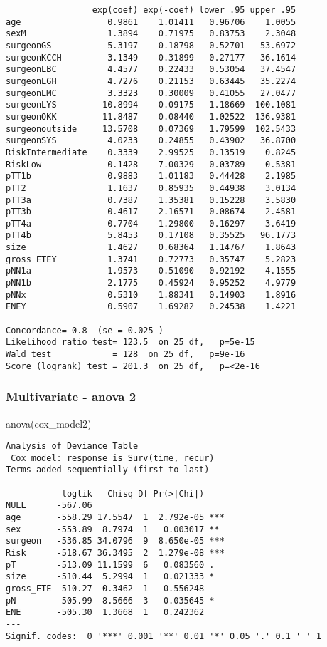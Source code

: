 \documentclass[
  letterpaper,
  DIV=11,
  numbers=noendperiod]{scrartcl}
\newenvironment{Shaded}{\begin{snugshade}}{\end{snugshade}}
\newcommand{\FunctionTok}[1]{\textcolor[rgb]{0.28,0.35,0.67}{#1}}
\newcommand{\NormalTok}[1]{\textcolor[rgb]{0.00,0.23,0.31}{#1}}
\begin{document}
\begin{verbatim}
                 exp(coef) exp(-coef) lower .95 upper .95
age                 0.9861    1.01411   0.96706    1.0055
sexM                1.3894    0.71975   0.83753    2.3048
surgeonGS           5.3197    0.18798   0.52701   53.6972
surgeonKCCH         3.1349    0.31899   0.27177   36.1614
surgeonLBC          4.4577    0.22433   0.53054   37.4547
surgeonLGH          4.7276    0.21153   0.63445   35.2274
surgeonLMC          3.3323    0.30009   0.41055   27.0477
surgeonLYS         10.8994    0.09175   1.18669  100.1081
surgeonOKK         11.8487    0.08440   1.02522  136.9381
surgeonoutside     13.5708    0.07369   1.79599  102.5433
surgeonSYS          4.0233    0.24855   0.43902   36.8700
RiskIntermediate    0.3339    2.99525   0.13519    0.8245
RiskLow             0.1428    7.00329   0.03789    0.5381
pTT1b               0.9883    1.01183   0.44428    2.1985
pTT2                1.1637    0.85935   0.44938    3.0134
pTT3a               0.7387    1.35381   0.15228    3.5830
pTT3b               0.4617    2.16571   0.08674    2.4581
pTT4a               0.7704    1.29800   0.16297    3.6419
pTT4b               5.8453    0.17108   0.35525   96.1773
size                1.4627    0.68364   1.14767    1.8643
gross_ETEY          1.3741    0.72773   0.35747    5.2823
pNN1a               1.9573    0.51090   0.92192    4.1555
pNN1b               2.1775    0.45924   0.95252    4.9779
pNNx                0.5310    1.88341   0.14903    1.8916
ENEY                0.5907    1.69282   0.24538    1.4221

Concordance= 0.8  (se = 0.025 )
Likelihood ratio test= 123.5  on 25 df,   p=5e-15
Wald test            = 128  on 25 df,   p=9e-16
Score (logrank) test = 201.3  on 25 df,   p=<2e-16
\end{verbatim}

\subsubsection{Multivariate - anova 2}\label{multivariate---anova-2}

\begin{Shaded}
\begin{Highlighting}[]
\FunctionTok{anova}\NormalTok{(cox\_model2)}
\end{Highlighting}
\end{Shaded}

\begin{verbatim}
Analysis of Deviance Table
 Cox model: response is Surv(time, recur)
Terms added sequentially (first to last)

           loglik   Chisq Df Pr(>|Chi|)    
NULL      -567.06                          
age       -558.29 17.5547  1  2.792e-05 ***
sex       -553.89  8.7974  1   0.003017 ** 
surgeon   -536.85 34.0796  9  8.650e-05 ***
Risk      -518.67 36.3495  2  1.279e-08 ***
pT        -513.09 11.1599  6   0.083560 .  
size      -510.44  5.2994  1   0.021333 *  
gross_ETE -510.27  0.3462  1   0.556248    
pN        -505.99  8.5666  3   0.035645 *  
ENE       -505.30  1.3668  1   0.242362    
---
Signif. codes:  0 '***' 0.001 '**' 0.01 '*' 0.05 '.' 0.1 ' ' 1
\end{verbatim}
\end{document}
